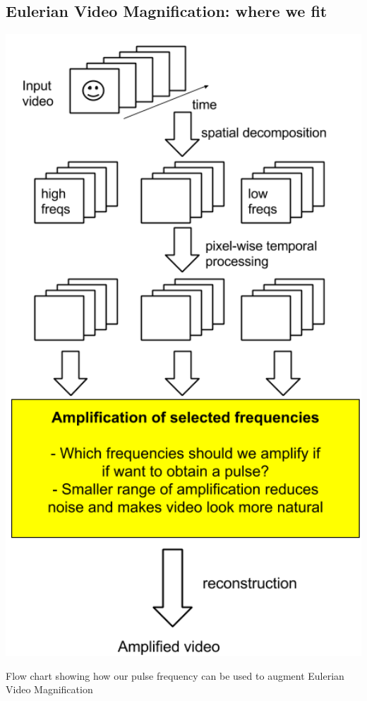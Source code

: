 \documentclass[a0,landscape]{a0poster}
\begin{document}
\begin{multicols}{4}
 \section*{Eulerian Video Magnification: where we fit}
  \includegraphics[width=26cm]{images/EVM_where_we_fit.png}
  \caption{Flow chart showing how our pulse frequency can be used to augment Eulerian Video Magnification}
  



\end{multicols}
\end{document}
